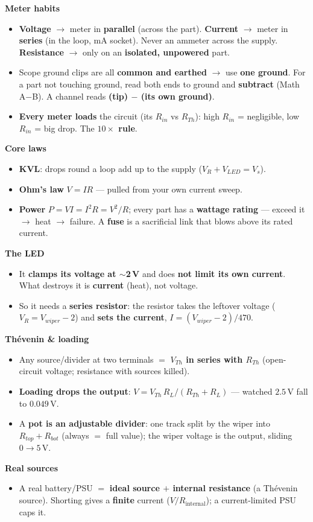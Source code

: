 \documentclass[11pt]{article}
\newcommand{\key}[1]{\textbf{#1}}
\begin{document}
\textbf{Meter habits}
\begin{itemize}
\item \key{Voltage} $\to$ meter in \key{parallel} (across the part). \key{Current} $\to$ meter in \key{series} (in the loop, mA socket). Never an ammeter across the supply. \key{Resistance} $\to$ only on an \key{isolated, unpowered} part.
\item Scope ground clips are all \key{common and earthed} $\to$ use \key{one ground}. For a part not touching ground, read both ends to ground and \key{subtract} (Math A$-$B). A channel reads \key{(tip) $-$ (its own ground)}.
\item \key{Every meter loads} the circuit (its $R_{in}$ vs $R_{Th}$): high $R_{in}$ = negligible, low $R_{in}$ = big drop. The \key{$10\times$ rule}.
\end{itemize}

\textbf{Core laws}
\begin{itemize}
\item \key{KVL}: drops round a loop add up to the supply ($V_R + V_{LED} = V_s$).
\item \key{Ohm's law} $V = IR$ --- pulled from your own current sweep.
\item \key{Power} $P = VI = I^2 R = V^2/R$; every part has a \key{wattage rating} --- exceed it $\to$ heat $\to$ failure. A \key{fuse} is a sacrificial link that blows above its rated current.
\end{itemize}

\textbf{The LED}
\begin{itemize}
\item It \key{clamps its voltage at $\sim$2\,V} and does \key{not limit its own current}. What destroys it is \key{current} (heat), not voltage.
\item So it needs a \key{series resistor}: the resistor takes the leftover voltage ($V_R = V_{wiper}-2$) and \key{sets the current}, $I = (V_{wiper}-2)/470$.
\end{itemize}

\textbf{Th\'evenin \& loading}
\begin{itemize}
\item Any source/divider at two terminals $=$ \key{$V_{Th}$ in series with $R_{Th}$} (open-circuit voltage; resistance with sources killed).
\item \key{Loading drops the output}: $V = V_{Th}\,R_L/(R_{Th}+R_L)$ --- watched $2.5\,$V fall to $0.049\,$V.
\item A \key{pot is an adjustable divider}: one track split by the wiper into $R_{top}+R_{bot}$ (always $=$ full value); the wiper voltage is the output, sliding $0\to5\,$V.
\end{itemize}

\textbf{Real sources}
\begin{itemize}
\item A real battery/PSU $=$ \key{ideal source $+$ internal resistance} (a Th\'evenin source). Shorting gives a \key{finite} current ($V/R_\text{internal}$); a current-limited PSU caps it.
\end{itemize}
\end{document}
